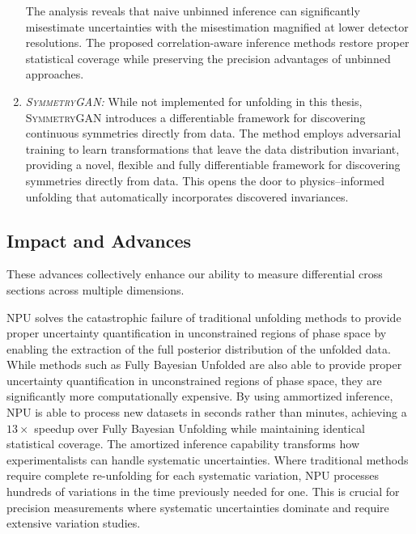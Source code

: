 \begin{enumerate}
            The analysis reveals that naive unbinned inference can significantly misestimate uncertainties with the misestimation magnified at lower detector resolutions.
            The proposed correlation-aware inference methods restore proper statistical coverage while preserving the precision advantages of unbinned approaches.
            \item \emph{\textsc{SymmetryGAN}:} While not implemented for unfolding in this thesis, \textsc{SymmetryGAN} introduces a differentiable framework for discovering continuous symmetries directly from data.
            The method employs adversarial training to learn transformations that leave the data distribution invariant, providing a novel, flexible and fully differentiable framework for discovering symmetries directly from data.
            This opens the door to physics--informed unfolding that automatically incorporates discovered invariances.
        \end{enumerate}
    \subsection{Impact and Advances}
        These advances collectively enhance our ability to measure differential cross sections across multiple dimensions.
        
        NPU solves the catastrophic failure of traditional unfolding methods to provide proper uncertainty quantification in unconstrained regions of phase space by enabling the extraction of the full posterior distribution of the unfolded data.
        While methods such as Fully Bayesian Unfolded are also able to provide proper uncertainty quantification in unconstrained regions of phase space, they are significantly more computationally expensive.
        By using ammortized inference, NPU is able to process new datasets in seconds rather than minutes, achieving a \(13\times\) speedup over Fully Bayesian Unfolding while maintaining identical statistical coverage.
        The amortized inference capability transforms how experimentalists can handle systematic uncertainties.
        Where traditional methods require complete re-unfolding for each systematic variation, NPU processes hundreds of variations in the time previously needed for one.
        This is crucial for precision measurements where systematic uncertainties dominate and require extensive variation studies.

